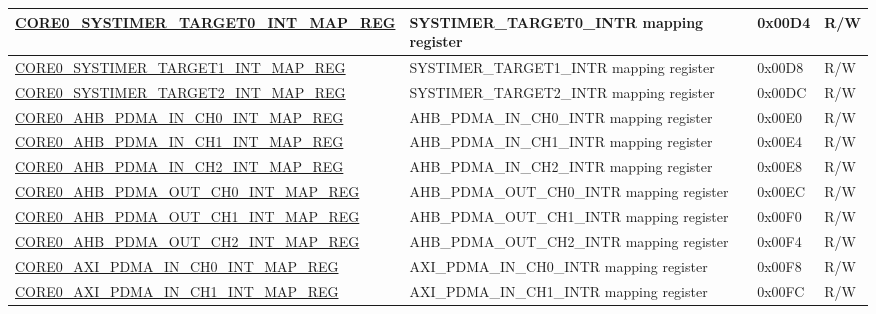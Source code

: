 \begin{longtable}{ | p{7.5cm} | p{7.2cm} | p{1.3cm} | p{1cm} | }
\hyperref[regdesc:CORE0SYSTIMERTARGET0INTMAPREG]{CORE0\_SYSTIMER\_TARGET0\_INT\_MAP\_REG} & SYSTIMER\_TARGET0\_INTR mapping register & 0x00D4 & R/W \\ \hline

\hyperref[regdesc:CORE0SYSTIMERTARGET1INTMAPREG]{CORE0\_SYSTIMER\_TARGET1\_INT\_MAP\_REG} & SYSTIMER\_TARGET1\_INTR mapping register & 0x00D8 & R/W \\ \hline

\hyperref[regdesc:CORE0SYSTIMERTARGET2INTMAPREG]{CORE0\_SYSTIMER\_TARGET2\_INT\_MAP\_REG} & SYSTIMER\_TARGET2\_INTR mapping register & 0x00DC & R/W \\ \hline

\hyperref[regdesc:CORE0AHBPDMAINCH0INTMAPREG]{CORE0\_AHB\_PDMA\_IN\_CH0\_INT\_MAP\_REG} & AHB\_PDMA\_IN\_CH0\_INTR mapping register & 0x00E0 & R/W \\ \hline

\hyperref[regdesc:CORE0AHBPDMAINCH1INTMAPREG]{CORE0\_AHB\_PDMA\_IN\_CH1\_INT\_MAP\_REG} & AHB\_PDMA\_IN\_CH1\_INTR mapping register & 0x00E4 & R/W \\ \hline

\hyperref[regdesc:CORE0AHBPDMAINCH2INTMAPREG]{CORE0\_AHB\_PDMA\_IN\_CH2\_INT\_MAP\_REG} & AHB\_PDMA\_IN\_CH2\_INTR mapping register & 0x00E8 & R/W \\ \hline

\hyperref[regdesc:CORE0AHBPDMAOUTCH0INTMAPREG]{CORE0\_AHB\_PDMA\_OUT\_CH0\_INT\_MAP\_REG} & AHB\_PDMA\_OUT\_CH0\_INTR mapping register & 0x00EC & R/W \\ \hline

\hyperref[regdesc:CORE0AHBPDMAOUTCH1INTMAPREG]{CORE0\_AHB\_PDMA\_OUT\_CH1\_INT\_MAP\_REG} & AHB\_PDMA\_OUT\_CH1\_INTR mapping register & 0x00F0 & R/W \\ \hline

\hyperref[regdesc:CORE0AHBPDMAOUTCH2INTMAPREG]{CORE0\_AHB\_PDMA\_OUT\_CH2\_INT\_MAP\_REG} & AHB\_PDMA\_OUT\_CH2\_INTR mapping register & 0x00F4 & R/W \\ \hline

\hyperref[regdesc:CORE0AXIPDMAINCH0INTMAPREG]{CORE0\_AXI\_PDMA\_IN\_CH0\_INT\_MAP\_REG} & AXI\_PDMA\_IN\_CH0\_INTR mapping register & 0x00F8 & R/W \\ \hline

\hyperref[regdesc:CORE0AXIPDMAINCH1INTMAPREG]{CORE0\_AXI\_PDMA\_IN\_CH1\_INT\_MAP\_REG} & AXI\_PDMA\_IN\_CH1\_INTR mapping register & 0x00FC & R/W \\ \hline


\end{longtable}
